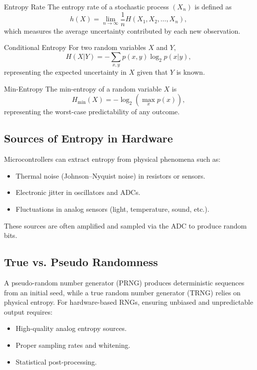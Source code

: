 \begin{defn}{Entropy Rate}{}
    The entropy rate of a stochastic process $(X_n)$ is defined as
    $$
    h(X) = \lim_{n \to \infty} \frac{1}{n} H(X_1, X_2, \dots, X_n),
    $$
    which measures the average uncertainty contributed by each new observation.
\end{defn}

\begin{defn}{Conditional Entropy}{}
For two random variables $X$ and $Y$,
$$
H(X|Y) = -\sum_{x,y} p(x,y) \log_2 p(x|y),
$$
representing the expected uncertainty in $X$ given that $Y$ is known.
\end{defn}

\begin{defn}{Min-Entropy}{}
The min-entropy of a random variable $X$ is
$$
H_{\text{min}}(X) = -\log_2 \left(\max_x p(x)\right),
$$
representing the worst-case predictability of any outcome.
\end{defn}

\subsection{Sources of Entropy in Hardware}
Microcontrollers can extract entropy from physical phenomena such as:
\begin{itemize}
    \item Thermal noise (Johnson–Nyquist noise) in resistors or 
        sensors.
    \item Electronic jitter in oscillators and ADCs.
    \item Fluctuations in analog sensors (light, temperature, sound, 
        etc.).
\end{itemize}
These sources are often amplified and sampled via the ADC to produce 
random bits.

\subsection{True vs. Pseudo Randomness}
A pseudo-random number generator (PRNG) produces deterministic 
sequences 
from an initial seed, while a true random number generator (TRNG) 
relies 
on physical entropy. 
For hardware-based RNGs, ensuring unbiased and unpredictable output 
requires:
\begin{itemize}
    \item High-quality analog entropy sources.
    \item Proper sampling rates and whitening.
    \item Statistical post-processing.
\end{itemize}

